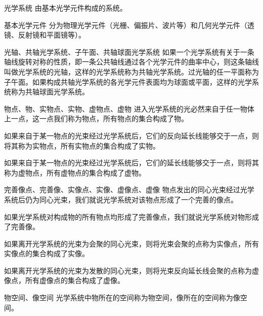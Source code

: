 

\begin{definition}{光学系统}
由基本光学元件构成的系统。
\end{definition}

\begin{definition}{基本光学元件}
分为物理光学元件（光栅、偏振片、波片等）和几何光学元件（透镜、反射镜和平面镜等）。
\end{definition}

\begin{definition}{光轴、共轴光学系统、子午面、共轴球面光学系统}
如果一个光学系统有关于一条轴线旋转对称的性质，即一条公共轴线通过各个光学元件的曲率中心，则这条轴线叫做光学系统的光轴，这样的光学系统称为共轴光学系统。过光轴的任一平面称为子午面。如果构成共轴光学系统的各光学元件表面均为球面或平面，这样的光学系统称为共轴球面光学系统。
\end{definition}

\begin{definition}{物点、物、实物点、实物、虚物点、虚物}
进入光学系统的光必然来自于任一物体上一点，这一点我们称为物点，所有物点的集合构成了物。

如果来自于某一物点的光束经过光学系统后，它们的反向延长线能够交于一点，则将其称为实物点，所有实物点的集合构成了实物。

如果来自于某一物点的光束经过光学系统后，它们的延长线能够交于一点，则将其称为虚物点，所有虚物点的集合构成了虚物。
\end{definition}

\begin{definition}{完善像点、完善像、实像点、实像、虚像点、虚像}
物点发出的同心光束经过光学系统后仍为同心光束，我们就说光学系统对该物点形成了一个完善的像点。

如果光学系统对构成物的所有物点均形成了完善像点，我们就说光学系统对物形成了完善像。

如果离开光学系统的光束为会聚的同心光束，则将光束会聚的点称为实像点，所有实像点的集合构成了实像。

如果离开光学系统的光束为发散的同心光束，则将光束反向延长线会聚的点称为虚像点，所有虚像点的集合构成了虚像。
\end{definition}

\begin{definition}{物空间、像空间}
光学系统中物所在的空间称为物空间，像所在的空间称为像空间。
\end{definition}
